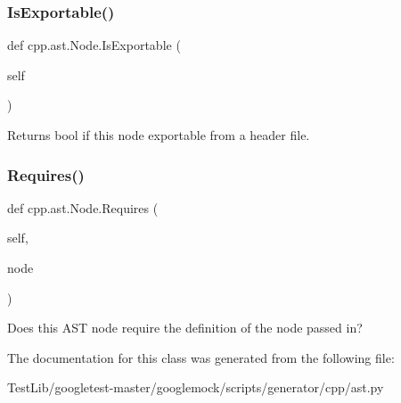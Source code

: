\subsubsection{\texorpdfstring{Is\+Exportable()}{IsExportable()}}
{\footnotesize\ttfamily def cpp.\+ast.\+Node.\+Is\+Exportable (\begin{DoxyParamCaption}\item[{}]{self }\end{DoxyParamCaption})}

\begin{DoxyVerb}Returns bool if this node exportable from a header file.\end{DoxyVerb}
 \mbox{\label{classcpp_1_1ast_1_1Node_a31ae211f954a8c578ef16226df5ac8c8}} 
\subsubsection{\texorpdfstring{Requires()}{Requires()}}
{\footnotesize\ttfamily def cpp.\+ast.\+Node.\+Requires (\begin{DoxyParamCaption}\item[{}]{self,  }\item[{}]{node }\end{DoxyParamCaption})}

\begin{DoxyVerb}Does this AST node require the definition of the node passed in?\end{DoxyVerb}
 

The documentation for this class was generated from the following file\+:\begin{DoxyCompactItemize}
\item 
Test\+Lib/googletest-\/master/googlemock/scripts/generator/cpp/ast.\+py\end{DoxyCompactItemize}
